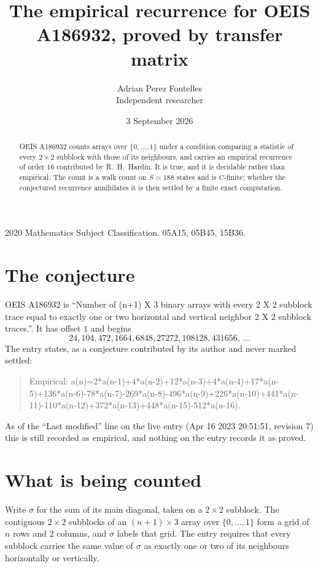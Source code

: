 \documentclass[11pt,a4paper]{article}
\title{The empirical recurrence for OEIS A186932, proved by transfer matrix}
\author{Adrian Perez Fontelles\\ \small Independent researcher}
\date{3 September 2026}
\theoremstyle{plain}
\theoremstyle{definition}
\begin{document}
\maketitle

\begin{abstract}
OEIS A186932 counts arrays over $\{0,\dots,1\}$ under a condition comparing a statistic of
every $2\times2$ subblock with those of its neighbours, and carries an empirical recurrence
of order $16$ contributed by R.~H.~Hardin. It is true, and it is decidable rather than
empirical. The count is a walk count on $S=188$ states and is $C$-finite; whether the
conjectured recurrence annihilates it is then settled by a finite exact computation.
\end{abstract}

\noindent\small 2020 Mathematics Subject Classification. 05A15, 05B45, 15B36.\normalsize

\section{The conjecture}

OEIS A186932 is ``Number of (n+1) X 3 binary arrays with every 2 X 2 subblock trace equal to exactly one or two horizontal and vertical neighbor 2 X 2 subblock traces.''. It has offset $1$ and begins
\[
24, 104, 472, 1664, 6848, 27272, 108128, 431656,\ \dots
\]
The entry states, as a conjecture contributed by its author and never marked settled:
\begin{quote}
Empirical: a(n)=2*a(n-1)+4*a(n-2)+12*a(n-3)+4*a(n-4)+17*a(n-5)+136*a(n-6)-78*a(n-7)-269*a(n-8)-496*a(n-9)+226*a(n-10)+441*a(n-11)-110*a(n-12)+372*a(n-13)+448*a(n-15)-512*a(n-16).
\end{quote}
As of the ``Last modified'' line on the live entry (Apr 16 2023 20:51:51, revision 7) this is still
recorded as empirical, and nothing on the entry records it as proved.

\section{What is being counted}

Write $\sigma$ for the sum of its main diagonal, taken on a $2\times2$ subblock. The contiguous $2\times2$
subblocks of an $(n+1)\times3$ array over $\{0,\dots,1\}$ form a grid of $n$ rows
and $2$ columns, and $\sigma$ labels that grid. The entry
requires that every subblock carries the same value of $\sigma$ as exactly one or two of its neighbours horizontally or vertically.
\end{document}
